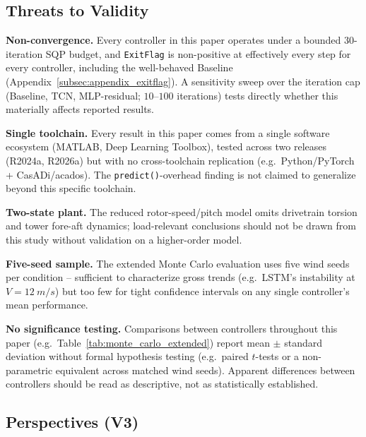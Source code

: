 \subsection{Threats to Validity}
\label{subsec:threats_to_validity}

\textbf{Non-convergence.} Every controller in this paper operates under
a bounded $30$-iteration SQP budget, and \texttt{ExitFlag} is
non-positive at effectively every step for every controller, including
the well-behaved Baseline (Appendix~\ref{subsec:appendix_exitflag}). A
sensitivity sweep over the iteration cap (Baseline, TCN, MLP-residual;
$10$--$100$ iterations) tests directly whether this materially affects
reported results.

\textbf{Single toolchain.} Every result in this paper comes from a
single software ecosystem (MATLAB, Deep Learning Toolbox), tested
across two releases (R2024a, R2026a) but with no cross-toolchain
replication (e.g.\ Python/PyTorch + CasADi/acados). The
\texttt{predict()}-overhead finding is not claimed to generalize beyond
this specific toolchain.

\textbf{Two-state plant.} The reduced rotor-speed/pitch model omits
drivetrain torsion and tower fore-aft dynamics; load-relevant
conclusions should not be drawn from this study without validation on
a higher-order model.

\textbf{Five-seed sample.} The extended Monte Carlo evaluation uses
five wind seeds per condition -- sufficient to characterize gross
trends (e.g.\ LSTM's instability at $V=\SI{12}{m/s}$) but too few for
tight confidence intervals on any single controller's mean performance.

\textbf{No significance testing.} Comparisons between controllers
throughout this paper (e.g.\ Table~\ref{tab:monte_carlo_extended})
report mean $\pm$ standard deviation without formal hypothesis
testing (e.g.\ paired $t$-tests or a non-parametric equivalent across
matched wind seeds). Apparent differences between controllers should be
read as descriptive, not as statistically established.

\subsection{Perspectives (V3)}
\label{subsec:perspectives_v3}

